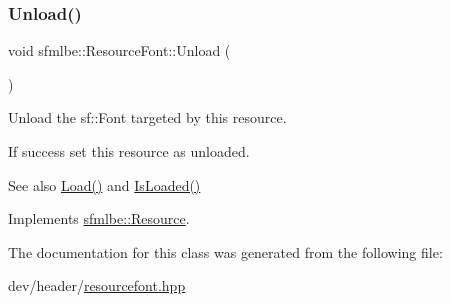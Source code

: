 \subsubsection{\texorpdfstring{Unload()}{Unload()}}
{\footnotesize\ttfamily void sfmlbe\+::\+Resource\+Font\+::\+Unload (\begin{DoxyParamCaption}{ }\end{DoxyParamCaption})\hspace{0.3cm}{\ttfamily [virtual]}}



Unload the sf\+::\+Font targeted by this resource. 

If success set this resource as unloaded. \begin{DoxySeeAlso}{See also}
\mbox{\hyperlink{classsfmlbe_1_1_resource_font_a8629842a4597fa4c22e58a85ae76bc74}{Load()}} and \mbox{\hyperlink{classsfmlbe_1_1_resource_acd0812c81f7d5d851a4671f0cf7bb4f1}{Is\+Loaded()}} 
\end{DoxySeeAlso}


Implements \mbox{\hyperlink{classsfmlbe_1_1_resource_a48c75a88679cf457965dd013f47014b9}{sfmlbe\+::\+Resource}}.



The documentation for this class was generated from the following file\+:\begin{DoxyCompactItemize}
\item 
dev/header/\mbox{\hyperlink{resourcefont_8hpp}{resourcefont.\+hpp}}\end{DoxyCompactItemize}
